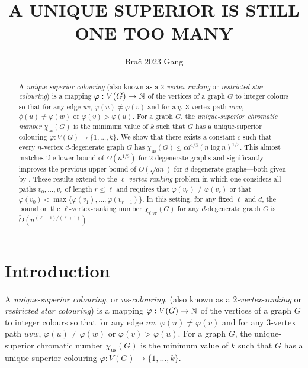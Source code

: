 \documentclass{patmorin}
\title{\MakeUppercase{A Unique Superior is Still One Too Many}}
\author{Bra\v{c} 2023 Gang}
\newcommand{\defin}[1]{\emph{\color{brightmaroon}#1}}
\newcommand{\rn}[1]{\chi_{\operatorname{#1-vr}}}
\newcommand{\trn}{\chi_{\mathrm{us}}}
\newcommand{\lrn}{\rn{\ell}}
\begin{document}
\maketitle

\begin{abstract}
  A \defin{unique-superior colouring} (also known as a \defin{$2$-vertex-ranking} or \defin{restricted star colouring}) is a mapping $\varphi:V(G)\to\mathbb{N}$ of the vertices of a graph $G$ to integer colours so that for any edge $uv$, $\varphi(u)\neq \varphi(v)$ and for any $3$-vertex path $uvw$, $\phi(u)\neq\varphi(w)$ or $\varphi(v)>\varphi(u)$.  For a graph $G$, the \defin{unique-superior chromatic number} $\trn(G)$ is the minimum value of $k$ such that $G$ has a unique-superior colouring $\varphi:V(G)\to\{1,\ldots,k\}$.  We show that there exists a constant $c$ such that every $n$-vertex $d$-degenerate graph $G$ has $\trn(G) \le cd^{4/3}(n\log n)^{1/3}$.  This almost matches the lower bound of $\Omega(n^{1/3})$ for $2$-degenerate graphs and significantly improves the previous upper bound of $O(\sqrt{dn})$ for $d$-degenerate graphs---both given by \citet{karpas.neiman.ea:on}. These results extend to the \defin{$\ell$-vertex-ranking} problem in which one considers all paths $v_0,\ldots,v_r$ of length $r\le \ell$ and requires that $\varphi(v_0)\neq\varphi(v_r)$ or that $\varphi(v_0)<\max\{\varphi(v_1),\ldots,\varphi(v_{r-1})\}$.  In this setting, for any fixed $\ell$ and $d$, the bound on the $\ell$-vertex-ranking number $\lrn(G)$ for any $d$-degenerate graph $G$ is $\tilde{O}(n^{(\ell-1)/(\ell+1)})$.
\end{abstract}


%



\section{Introduction}

A \defin{unique-superior colouring}, or \defin{us-colouring}, (also known as a \defin{$2$-vertex-ranking} or \defin{restricted star colouring}) is a mapping $\varphi:V(G)\to\mathbb{N}$ of the vertices of a graph $G$ to integer colours so that for any edge $uv$, $\varphi(u)\neq \varphi(v)$ and for any $3$-vertex path $uvw$, $\varphi(u)\neq\varphi(w)$ or $\varphi(v)>\varphi(u)$.  For a graph $G$, the unique-superior chromatic number $\trn(G)$ is the minimum value of $k$ such that $G$ has a unique-superior colouring $\varphi:V(G)\to\{1,\ldots,k\}$.
\end{document}
